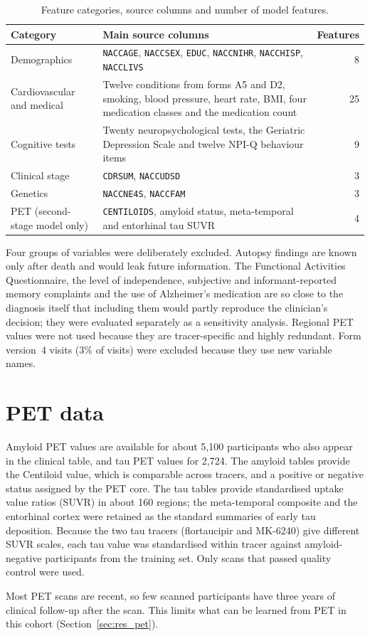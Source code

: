 \begin{table}[H]
\centering\small
\caption{Feature categories, source columns and number of model features.}
\label{tab:categories}
\begin{tabularx}{\textwidth}{@{}lYr@{}}
\toprule
Category & Main source columns & Features \\
\midrule
Demographics & \texttt{NACCAGE}, \texttt{NACCSEX}, \texttt{EDUC}, \texttt{NACCNIHR}, \texttt{NACCHISP}, \texttt{NACCLIVS} & 8 \\
Cardiovascular and medical & Twelve conditions from forms A5 and D2, smoking, blood pressure, heart rate, BMI, four medication classes and the medication count & 25 \\
Cognitive tests & Twenty neuropsychological tests, the Geriatric Depression Scale and twelve NPI-Q behaviour items & 9 \\
Clinical stage & \texttt{CDRSUM}, \texttt{NACCUDSD} & 3 \\
Genetics & \texttt{NACCNE4S}, \texttt{NACCFAM} & 3 \\
PET (second-stage model only) & \texttt{CENTILOIDS}, amyloid status, meta-temporal and entorhinal tau SUVR & 4 \\
\bottomrule
\end{tabularx}
\end{table}

Four groups of variables were deliberately excluded. Autopsy findings are known only after death and would leak future information. The Functional Activities Questionnaire, the level of independence, subjective and informant-reported memory complaints and the use of Alzheimer's medication are so close to the diagnosis itself that including them would partly reproduce the clinician's decision; they were evaluated separately as a sensitivity analysis. Regional PET values were not used because they are tracer-specific and highly redundant. Form version~4 visits (3\% of visits) were excluded because they use new variable names.

\section{PET data}
\label{sec:petdata}

Amyloid PET values are available for about 5,100 participants who also appear in the clinical table, and tau PET values for 2,724. The amyloid tables provide the Centiloid value, which is comparable across tracers, and a positive or negative status assigned by the PET core. The tau tables provide standardised uptake value ratios (SUVR) in about 160 regions; the meta-temporal composite and the entorhinal cortex were retained as the standard summaries of early tau deposition. Because the two tau tracers (flortaucipir and MK-6240) give different SUVR scales, each tau value was standardised within tracer against amyloid-negative participants from the training set. Only scans that passed quality control were used.

Most PET scans are recent, so few scanned participants have three years of clinical follow-up after the scan. This limits what can be learned from PET in this cohort (Section~\ref{sec:res_pet}).
